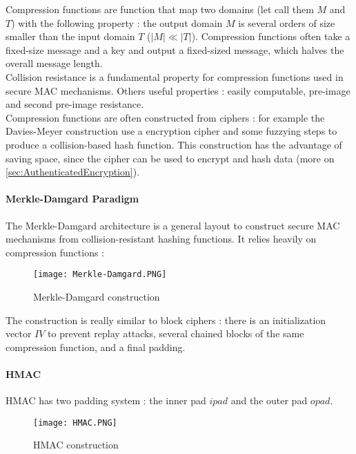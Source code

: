 Compression functions are function that map two domains (let call them $M$ and $T$) with the following property : the output domain $M$ is several orders of size smaller than the input domain $T$ ($|M| \ll |T|$). Compression functions often take a fixed-size message and a key and output a fixed-sized message, which halves the overall message length. \\
Collision resistance is a fundamental property for compression functions used in secure MAC mechanisms. Others useful properties : easily computable, pre-image and second pre-image resistance. \\
Compression functions are often constructed from ciphers : for example the Davies-Meyer construction use a encryption cipher and some fuzzying steps to produce a collision-based hash function. This construction has the advantage of saving space, since the cipher can be used to encrypt and hash data (more on \ref{sec:AuthenticatedEncryption}).

\paragraph{Merkle-Damgard Paradigm}

The Merkle-Damgard architecture is a general layout to construct secure MAC mechanisms from collision-resistant hashing functions. It relies heavily on compression functions :

\begin{figure}[h!]
	\centering
		\texttt{[image: Merkle-Damgard.PNG]}
	\caption{Merkle-Damgard construction}
	\label{fig:MerkleDamgardConstruction}
\end{figure}

The construction is really similar to block ciphers : there is an initialization vector $IV$ to prevent replay attacks, several chained blocks of the same compression function, and a final padding. 

\paragraph{HMAC}

HMAC has two padding system : the inner pad $ipad$ and the outer pad $opad$.

\begin{figure}[h!]
	\centering
		\texttt{[image: HMAC.PNG]}
	\caption{HMAC construction}
	\label{fig:HMACConstruction}
\end{figure}

